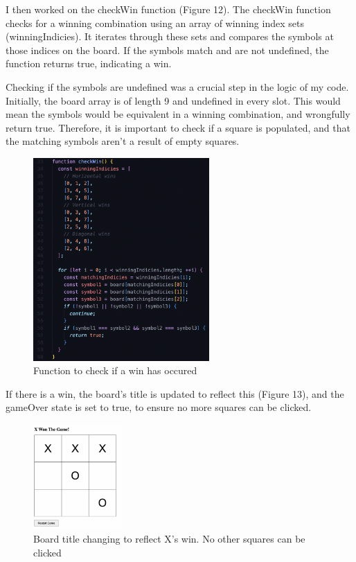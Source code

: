 \documentclass[a4paper, 11pt]{report}
\begin{document}
I then worked on the checkWin function (Figure 12). The checkWin function checks for a winning combination using an array of winning index sets (winningIndicies). It iterates through these sets and compares the symbols at those indices on the board. If the symbols match and are not undefined, the function returns true, indicating a win. 

Checking if the symbols are undefined was a crucial step in the logic of my code. Initially, the board array is of length 9 and undefined in every slot. This would mean the symbols would be equivalent in a winning combination, and wrongfully return true. Therefore, it is important to check if a square is populated, and that the matching symbols aren't a result of empty squares.

\begin{figure}[ht]
    \centering
    \includegraphics[width=0.6\textwidth]{Images/ttt4.png}
    \caption{Function to check if a win has occured}
    \label{fig:screenshot}
\end{figure}

If there is a win, the board's title is updated to reflect this (Figure 13), and the gameOver state is set to true, to ensure no more squares can be clicked. 

\begin{figure}[ht]
    \centering
    \includegraphics[width=0.3\textwidth]{Images/ttt5.png}
    \caption{Board title changing to reflect X's win. No other squares can be clicked}
    \label{fig:screenshot}
\end{figure}
\end{document}
